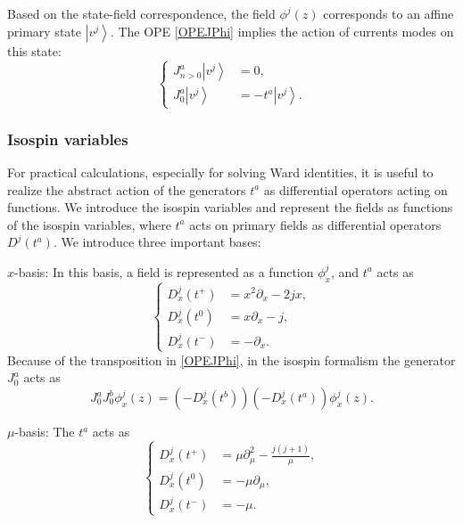 \documentclass[10pt,a4paper]{article}
\numberwithin{equation}{section}
\newcommand{\ket}[1]{\left| #1 \right\rangle}
\begin{document}
Based on the state-field correspondence, the field $\phi^{j}(z)$ corresponds to an affine primary state $\ket{v^{j}}$. 
The OPE \eqref{OPEJPhi} implies the action of currents modes on this state:
\begin{equation}
    \left\{
        \begin{aligned}
            J^{a}_{n>0} \ket{v^{j}} &= 0,\\
            J^{a}_{0} \ket{v^{j}} &= - t^{a} \ket{v^{j}}.
        \end{aligned}
    \right.
\end{equation}

\subsubsection*{Isospin variables}
For practical calculations, especially for solving Ward identities, it is useful to realize the abstract action of the generators 
$t^{a}$ as differential operators acting on functions. We introduce the isospin variables and 
represent the fields as functions of the isospin variables, 
where $t^{a}$ acts on primary fields as differential operators $D^{j}(t^{a})$. We introduce three important bases:

$x$-basis: In this basis, a field is represented as a function $\phi^{j}_{x}$, and $t^{a}$ acts as 
\begin{equation}
    \left\{
        \begin{aligned}
            D^{j}_{x}(t^{+}) &= x^{2} \partial_{x} - 2 j x, \\
            D^{j}_{x}(t^{0}) &= x \partial_{x} - j, \\
            D^{j}_{x}(t^{-}) &= - \partial_{x}.
        \end{aligned}
    \right. \label{Diffx}
\end{equation}
Because of the transposition in \eqref{OPEJPhi}, in the isospin formalism the generator $J^{a}_{0}$ acts as 
\begin{equation}
    J^{a}_{0} J^{b}_{0} \phi^{j}_{x}(z) = \left( -D^{j}_{x}\left(t^{b}\right) \right) \left( -D^{j}_{x}\left(t^{a}\right) \right) \phi^{j}_{x}(z).
\end{equation}

$\mu$-basis: The $t^{a}$ acts as 
\begin{equation}
    \left\{
        \begin{aligned}
            D^{j}_{x}(t^{+}) &= \mu \partial_{\mu}^{2} - \frac{j(j+1)}{\mu}, \\
            D^{j}_{x}(t^{0}) &= -\mu \partial_{\mu}, \\
            D^{j}_{x}(t^{-}) &= -\mu.
        \end{aligned}
    \right. \label{Diffmu}
\end{equation}
\end{document}
